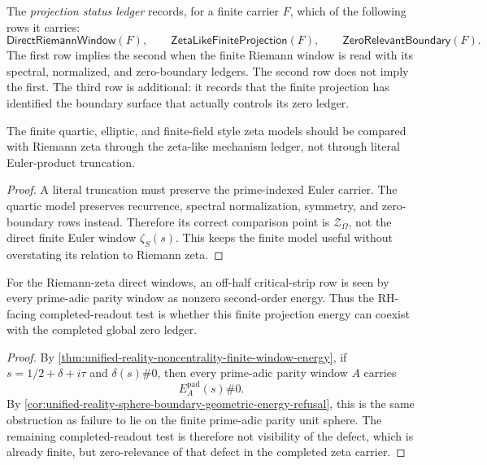\begin{definition}
\label{def:unified-reality-projection-status-ledger}
The \emph{projection status ledger} records, for a finite carrier $F$,
which of the following rows it carries:
$$
\mathsf{DirectRiemannWindow}(F),
\qquad
\mathsf{ZetaLikeFiniteProjection}(F),
\qquad
\mathsf{ZeroRelevantBoundary}(F).
$$
The first row implies the second when the finite Riemann window is read
with its spectral, normalized, and zero-boundary ledgers.  The second row
does not imply the first.  The third row is additional: it records that
the finite projection has identified the boundary surface that actually
controls its zero ledger.
\end{definition}

\begin{corollary}
\label{cor:unified-reality-projection-status-separates-analogy-truncation}
The finite quartic, elliptic, and finite-field style zeta models should
be compared with Riemann zeta through the zeta-like mechanism ledger, not
through literal Euler-product truncation.
\end{corollary}

\begin{proof}
A literal truncation must preserve the prime-indexed Euler carrier.  The
quartic model preserves recurrence, spectral normalization, symmetry, and
zero-boundary rows instead.  Therefore its correct comparison point is
$\mathcal Z_{\Omega}$, not the direct finite Euler window
$\zeta_S(s)$.  This keeps the finite model useful without overstating its
relation to Riemann zeta.
\end{proof}

\begin{theorem}
\label{thm:unified-reality-finite-projection-energy-completed-readout-test}
For the Riemann-zeta direct windows, an off-half critical-strip row is
seen by every prime-adic parity window as nonzero second-order energy.
Thus the RH-facing completed-readout test is whether this finite
projection energy can coexist with the completed global zero ledger.
\end{theorem}

\begin{proof}
By
\autoref{thm:unified-reality-noncentrality-finite-window-energy}, if
$s=1/2+\delta+i\tau$ and $\delta(s)\#0$, then every prime-adic parity
window $A$ carries
$$
E_A^{\mathrm{pad}}(s)\#0.
$$
By
\autoref{cor:unified-reality-sphere-boundary-geometric-energy-refusal},
this is the same obstruction as failure to lie on the finite
prime-adic parity unit sphere.  The remaining completed-readout test is
therefore not visibility of the defect, which is already finite, but
zero-relevance of that defect in the completed zeta carrier.
\end{proof}

